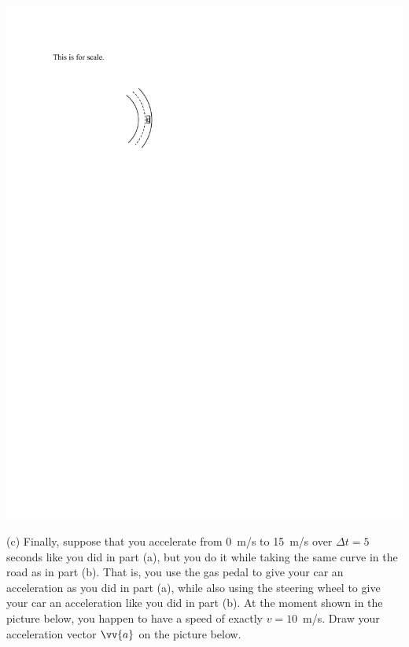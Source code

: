 \hspace{1.0in}\includegraphics{tangential_and_centripetal_acc/curve2.pdf}

\pagebreak[3]
(c) Finally, suppose that you 
accelerate from 0~m/s to 15~m/s over $\Delta t = 5$ seconds like you did in part (a), but you do it while taking the same curve in the road as in part (b).  That is, you use the gas pedal to give your car an acceleration as you did in part (a), while also using the steering wheel to give your car an acceleration like you did in part (b). At the moment shown in the picture below, you happen to have a speed of exactly $v=10$~m/s.  Draw your acceleration vector $\vv{a}$ on the picture below.

